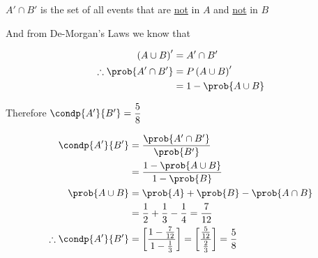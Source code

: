\documentclass[14pt,fleqn]{extarticle}
\begin{document}
\begin{problem}
\begin{step}
     $A'\cap B'$ is the set of all events that are \underline{not} in $A$ and \underline{not} in $B$\newline 
     
     And from De-Morgan's Laws we know that 
     
     \begin{align}
	\left(A\cup B \right)' &= A'\cap B'  \\
	\therefore \prob{A'\cap B'} &= P \left(A\cup B \right)' \\
	&= 1 - \prob{A\cup B}
\end{align}
     
\end{step}

\begin{step}
  \begin{options} 
     \correct 
       
     Therefore $\condp{A'}{B'} = \dfrac{5}{8}$ 
        
    \end{options} 
     \reason 
     
     \begin{align}
	\condp{A'}{B'} &= \dfrac{\prob{A'\cap B'}}{\prob{B'}} \\
	&= \dfrac{1-\prob{A\cup B}}{1-\prob{B}} \\
	\prob{A\cup B} &= \prob{A} + \prob{B} - \prob{A\cap B} \\
	&= \frac{1}{2} + \frac{1}{3} - \frac{1}{4} = \frac{7}{12} \\
	\therefore \condp{A'}{B'} &= \left[\dfrac{1-\frac{7}{12}}{1-\frac{1}{3}}  \right]= \left[\dfrac{\frac{5}{12}}{\frac{2}{3}} \right] = \frac{5}{8}
\end{align}
       
\end{step}
\end{problem} 
\end{document}
